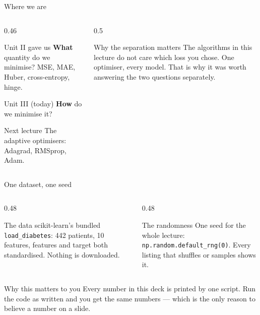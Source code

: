 \documentclass[aspectratio=169]{beamer}
\begin{document}
\begin{frame}[shrink=4]{Where we are}
  \begin{columns}[T]
    \begin{column}{0.46\textwidth}
      \begin{block}{Unit II gave us}
        \textbf{What} quantity do we minimise? MSE, MAE, Huber,
        cross-entropy, hinge.
      \end{block}
      \begin{exampleblock}{Unit III (today)}
        \textbf{How} do we minimise it?
      \end{exampleblock}
      \begin{block}{Next lecture}
        The adaptive optimisers: Adagrad, RMSprop, Adam.
      \end{block}
    \end{column}
    \begin{column}{0.5\textwidth}
      \begin{alertblock}{Why the separation matters}
        The algorithms in this lecture do not care which loss you chose. One
        optimiser, every model. That is why it was worth answering the two
        questions separately.
      \end{alertblock}
    \end{column}
  \end{columns}
\end{frame}

\begin{frame}{One dataset, one seed}
  \begin{columns}[T]
    \begin{column}{0.48\textwidth}
      \begin{block}{The data}
        \small scikit-learn's bundled \texttt{load\_diabetes}: 442 patients,
        10 features, features and target both standardised. Nothing is
        downloaded.
      \end{block}
    \end{column}
    \begin{column}{0.48\textwidth}
      \begin{block}{The randomness}
        \small One seed for the whole lecture:
        \texttt{np.random.default\_rng(0)}. Every listing that shuffles or
        samples shows it.
      \end{block}
    \end{column}
  \end{columns}
  \vspace{0.5em}
  \begin{exampleblock}{Why this matters to you}
    \centering\small
    Every number in this deck is printed by one script. Run the code as
    written and you get the same numbers --- which is the only reason to
    believe a number on a slide.
  \end{exampleblock}
\end{frame}
\end{document}
